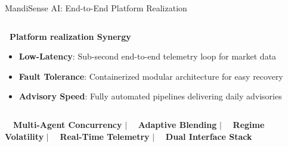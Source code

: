 \documentclass{beamer}
\begin{document}
\begin{frame}{MandiSense AI: End-to-End Platform Realization}
\begin{columns}[T]
    \begin{smallcard}[0.98\textwidth, top=1.5pt, bottom=1.5pt, left=4pt, right=4pt, boxsep=0.5pt]
        \textbf{\textcolor{primaryDark}{\fontsize{6.5pt}{7.5pt}\selectfont {}~Platform realization Synergy}}
        \vspace{0.02cm}
        \begin{itemize}\setlength\itemsep{0.5pt}\setlength\parskip{0pt}
            \tiny
            \item \textbf{Low-Latency}: Sub-second end-to-end telemetry loop for market data
            \item \textbf{Fault Tolerance}: Containerized modular architecture for easy recovery
            \item \textbf{Advisory Speed}: Fully automated pipelines delivering daily advisories
        \end{itemize}
    \end{smallcard}
\end{columns}

\vspace{0.04cm}

\begin{tcolorbox}[enhanced, colback=primaryblue!4, colframe=primaryblue!30, boxrule=0.35pt,
  arc=3.5pt, width=0.98\textwidth, left=4pt, right=4pt, top=2.5pt, bottom=2.5pt, boxsep=0pt,
  halign=center, shadow={0.5pt}{-0.5pt}{0pt}{black!8}]
    \fontsize{5.5pt}{6.5pt}\selectfont
    \textcolor{primaryDark}{~~\textbf{Multi-Agent Concurrency} \quad $\vert$ \quad {}~~\textbf{Adaptive Blending} \quad $\vert$ \quad {}~~\textbf{Regime Volatility} \quad $\vert$ \quad {}~~\textbf{Real-Time Telemetry} \quad $\vert$ \quad {}~~\textbf{Dual Interface Stack}}
\end{tcolorbox}
\end{frame}

\end{document}

